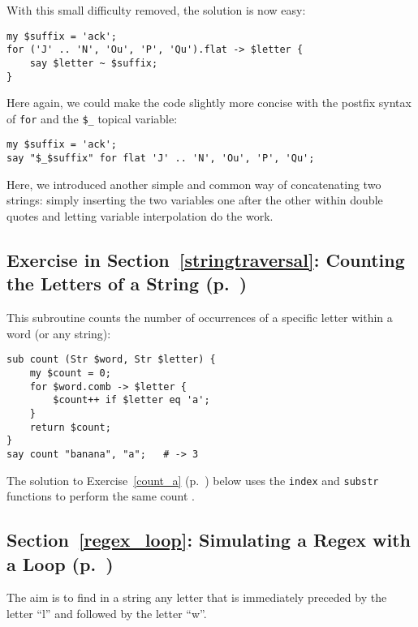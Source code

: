 With this small difficulty removed, the solution is now easy:

\begin{verbatim}
my $suffix = 'ack';
for ('J' .. 'N', 'Ou', 'P', 'Qu').flat -> $letter {
    say $letter ~ $suffix;
}
\end{verbatim}
%

Here again, we could make the code slightly more concise with 
the postfix syntax of {\tt for} and the \verb'$_' topical 
variable:

\begin{verbatim}
my $suffix = 'ack';
say "$_$suffix" for flat 'J' .. 'N', 'Ou', 'P', 'Qu';
\end{verbatim}
%

Here, we introduced another simple and common way of 
concatenating two strings: simply inserting the two 
variables one after the other within double quotes and 
letting variable interpolation do the work.


\subsection{Exercise in Section~\ref{stringtraversal}: Counting the Letters of a String (p.~\pageref{stringtraversal})}
\label{sol_count_letters}

This subroutine counts the number of occurrences of 
a specific letter within a word (or any string):

\begin{verbatim}
sub count (Str $word, Str $letter) {
    my $count = 0;
    for $word.comb -> $letter {
        $count++ if $letter eq 'a';
    }
    return $count;   
}
say count "banana", "a";   # -> 3
\end{verbatim}
%

The solution to Exercise~\ref{count_a} 
(p.~\pageref{sol_count_a}) below uses the 
{\tt index} and {\tt substr} functions to perform 
the same count .


\subsection{Section~\ref{regex_loop}: Simulating a Regex with a Loop (p.~\pageref{regex_loop})}
\label{sol_regex_loop}

The aim is to find in a string any letter that is 
immediately preceded by the letter ``l'' and followed by 
the letter ``w''.

